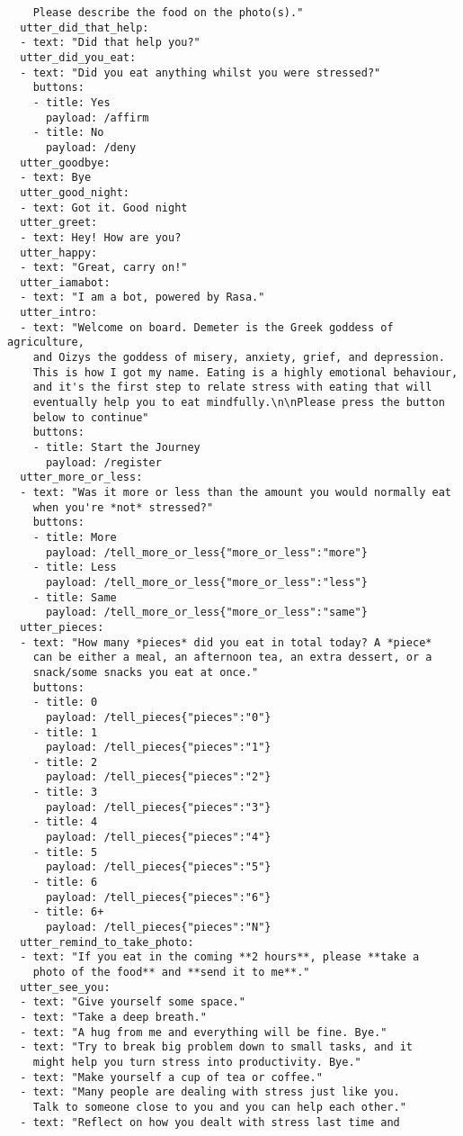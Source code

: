 \begin{lstlisting}
    Please describe the food on the photo(s)."
  utter_did_that_help:
  - text: "Did that help you?"
  utter_did_you_eat:
  - text: "Did you eat anything whilst you were stressed?"
    buttons:
    - title: Yes
      payload: /affirm
    - title: No
      payload: /deny
  utter_goodbye:
  - text: Bye
  utter_good_night:
  - text: Got it. Good night
  utter_greet:
  - text: Hey! How are you?
  utter_happy:
  - text: "Great, carry on!"
  utter_iamabot:
  - text: "I am a bot, powered by Rasa."
  utter_intro:
  - text: "Welcome on board. Demeter is the Greek goddess of agriculture,
    and Oizys the goddess of misery, anxiety, grief, and depression.
    This is how I got my name. Eating is a highly emotional behaviour,
    and it's the first step to relate stress with eating that will
    eventually help you to eat mindfully.\n\nPlease press the button
    below to continue"
    buttons:
    - title: Start the Journey
      payload: /register
  utter_more_or_less:
  - text: "Was it more or less than the amount you would normally eat
    when you're *not* stressed?"
    buttons:
    - title: More
      payload: /tell_more_or_less{"more_or_less":"more"}
    - title: Less
      payload: /tell_more_or_less{"more_or_less":"less"}
    - title: Same
      payload: /tell_more_or_less{"more_or_less":"same"}
  utter_pieces:
  - text: "How many *pieces* did you eat in total today? A *piece*
    can be either a meal, an afternoon tea, an extra dessert, or a
    snack/some snacks you eat at once."
    buttons:
    - title: 0
      payload: /tell_pieces{"pieces":"0"}
    - title: 1
      payload: /tell_pieces{"pieces":"1"}
    - title: 2
      payload: /tell_pieces{"pieces":"2"}
    - title: 3
      payload: /tell_pieces{"pieces":"3"}
    - title: 4
      payload: /tell_pieces{"pieces":"4"}
    - title: 5
      payload: /tell_pieces{"pieces":"5"}
    - title: 6
      payload: /tell_pieces{"pieces":"6"}
    - title: 6+
      payload: /tell_pieces{"pieces":"N"}
  utter_remind_to_take_photo:
  - text: "If you eat in the coming **2 hours**, please **take a
    photo of the food** and **send it to me**."
  utter_see_you:
  - text: "Give yourself some space."
  - text: "Take a deep breath."
  - text: "A hug from me and everything will be fine. Bye."
  - text: "Try to break big problem down to small tasks, and it
    might help you turn stress into productivity. Bye."
  - text: "Make yourself a cup of tea or coffee."
  - text: "Many people are dealing with stress just like you.
    Talk to someone close to you and you can help each other."
  - text: "Reflect on how you dealt with stress last time and

\end{lstlisting}
